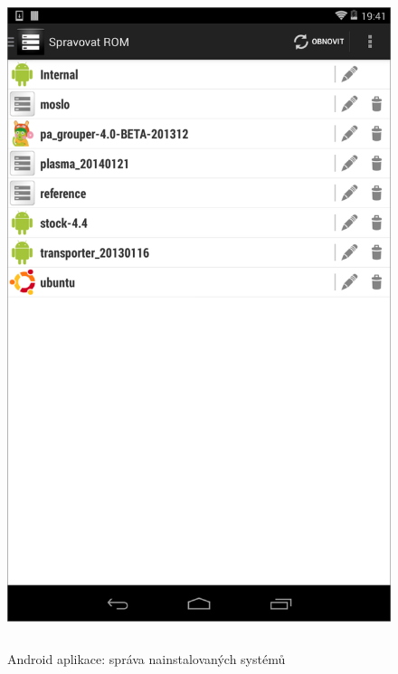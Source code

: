 \documentclass[12pt, a4paper, oneside]{article}
\begin{document}
\begin{figure}[H]
\begin{center}
 \includegraphics[height=550pt]{../img/app_roms.png}
\caption{Android aplikace: správa nainstalovaných systémů}
\end{center}
\end{figure}
\end{document}
